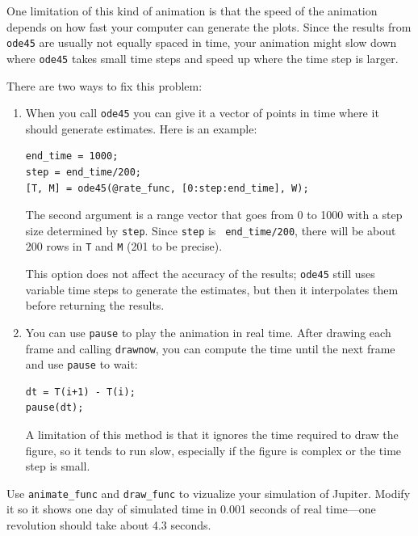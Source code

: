 \documentclass{book}
\begin{document}
One limitation of this kind of animation is that the speed
of the animation depends on how fast your computer can generate
the plots. Since the results from {\tt ode45} are usually not
equally spaced in time, your animation might slow down where
{\tt ode45} takes small time steps and speed up where the time
step is larger.

There are two ways to fix this problem:

\begin{enumerate}

\item When you call {\tt ode45} you can give it a vector of
points in time where it should generate estimates. Here is
an example:

\begin{verbatim}
end_time = 1000;
step = end_time/200;
[T, M] = ode45(@rate_func, [0:step:end_time], W);
\end{verbatim}

The second argument is a range vector that goes from 0 to 1000 with a
step size determined by {\tt step}. Since {\tt step} is {\tt
end\_time/200}, there will be about 200 rows in {\tt T} and {\tt M}
(201 to be precise).

This option does not affect the accuracy of the results; {\tt ode45}
still uses variable time steps to generate the estimates, but then it
interpolates them before returning the results.

\item You can use {\tt pause} to play the animation in
real time. After drawing each frame and calling
{\tt drawnow}, you can compute the time
until the next frame and use {\tt pause} to wait:

\begin{verbatim}
dt = T(i+1) - T(i);
pause(dt);
\end{verbatim}

A limitation of this method is that it ignores the time required to
draw the figure, so it tends to run slow, especially if the figure is
complex or the time step is small.

\end{enumerate}

\begin{ex}
Use {\tt animate\_func} and {\tt draw\_func} to vizualize your
simulation of Jupiter. Modify it so it shows one day of simulated
time in 0.001 seconds of real time---one revolution should take
about 4.3 seconds.
\end{ex}
\end{document}
